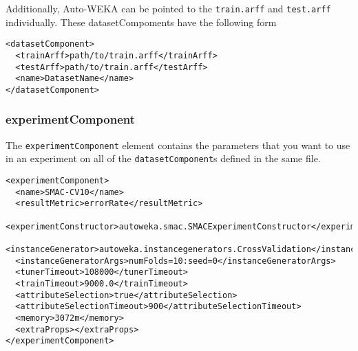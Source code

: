 Additionally, Auto-WEKA can be pointed to the \texttt{train.arff} and \texttt{test.arff} individually. These datasetCompoments have the following form

\begin{verbatim}
<datasetComponent>
  <trainArff>path/to/train.arff</trainArff>
  <testArff>path/to/train.arff</testArff>
  <name>DatasetName</name>
</datasetComponent>
\end{verbatim}

\subsubsection{experimentComponent}\label{sec:experimentdefs:excomp}

The \texttt{experimentComponent} element contains the parameters that you want to use in an experiment on all of the \texttt{datasetComponent}s defined in the same file. 

\begin{verbatim}
<experimentComponent>
  <name>SMAC-CV10</name>
  <resultMetric>errorRate</resultMetric>
  <experimentConstructor>autoweka.smac.SMACExperimentConstructor</experimentConstructor>
  <instanceGenerator>autoweka.instancegenerators.CrossValidation</instanceGenerator>
  <instanceGeneratorArgs>numFolds=10:seed=0</instanceGeneratorArgs>
  <tunerTimeout>108000</tunerTimeout>
  <trainTimeout>9000.0</trainTimeout>
  <attributeSelection>true</attributeSelection>
  <attributeSelectionTimeout>900</attributeSelectionTimeout>
  <memory>3072m</memory>
  <extraProps></extraProps>
</experimentComponent>
\end{verbatim}
    
